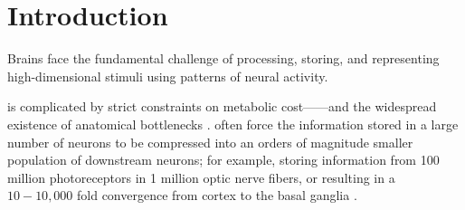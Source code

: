 %

\section*{Introduction}
\label{sec:introduction}
Brains face the fundamental challenge of 
processing, storing, and representing high-dimensional stimuli
using patterns of neural activity.

 is complicated
by strict constraints on metabolic cost------and the 
widespread existence of anatomical bottlenecks 
\cite{Kempermann2002,BarGad2003_Review,Babinsky1993}.
 often force the information
stored in a large number of neurons
to be compressed into an orders of magnitude smaller population
of downstream neurons;
for example, storing information from 100 million photoreceptors 
in 1 million optic nerve fibers,
or resulting in a $10 - 10,000$ fold convergence from cortex to the basal ganglia
\cite{GanguliSompolinsky2012}.

